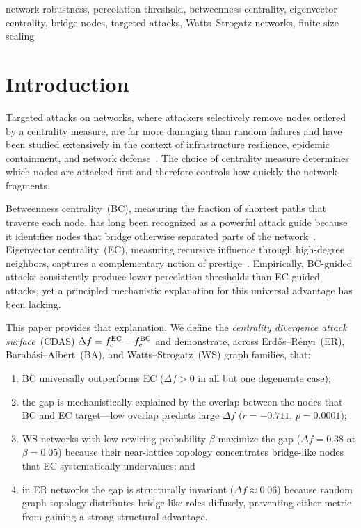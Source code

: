 \documentclass[journal]{IEEEtran}
\begin{document}
\begin{IEEEkeywords}
network robustness, percolation threshold, betweenness centrality, eigenvector
centrality, bridge nodes, targeted attacks, Watts--Strogatz networks,
finite-size scaling
\end{IEEEkeywords}

\section{Introduction}

Targeted attacks on networks, where attackers selectively remove nodes ordered by a
centrality measure, are far more damaging than random failures and have been
studied extensively in the context of infrastructure resilience, epidemic
containment, and network defense~\cite{albert2000error,newman2003structure}.
The choice of centrality measure determines which nodes are attacked first and
therefore controls how quickly the network fragments.

Betweenness centrality~(BC), measuring the fraction of shortest paths that
traverse each node, has long been recognized as a powerful attack guide
because it identifies nodes that bridge otherwise separated
parts of the network~\cite{freeman1977set,girvan2002community}.
Eigenvector centrality~(EC), measuring recursive influence through
high-degree neighbors, captures a complementary notion of
prestige~\cite{bonacich1987power}.
Empirically, BC-guided attacks consistently produce lower percolation thresholds
than EC-guided attacks, yet a principled mechanistic explanation for this
universal advantage has been lacking.

This paper provides that explanation.
We define the \emph{centrality divergence attack surface}~(CDAS)
$\Delta f = f_c^{\rm EC} - f_c^{\rm BC}$ and demonstrate, across
Erd\H{o}s--R\'enyi~(ER), Barab\'asi--Albert~(BA), and
Watts--Strogatz~(WS) graph families, that:
\begin{enumerate}
  \item BC universally outperforms EC ($\Delta f > 0$ in all but one degenerate case);
  \item the gap is mechanistically explained by the overlap between the nodes
        that BC and EC target---low overlap predicts large $\Delta f$
        ($r = -0.711$, $p = 0.0001$);
  \item WS networks with low rewiring probability $\beta$ maximize the gap
        ($\Delta f = 0.38$ at $\beta = 0.05$) because their near-lattice
        topology concentrates bridge-like nodes that EC systematically
        undervalues; and
  \item in ER networks the gap is structurally invariant ($\Delta f \approx 0.06$)
        because random graph topology distributes bridge-like roles diffusely,
        preventing either metric from gaining a strong structural advantage.
\end{enumerate}
\end{document}
